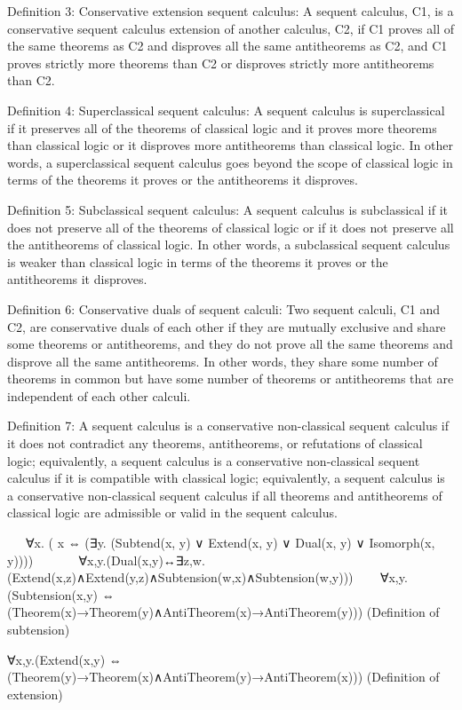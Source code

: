 \documentclass{article}
\begin{document}
Definition 3: Conservative extension sequent calculus:
A sequent calculus, C1, is a conservative sequent calculus extension of another calculus, C2, if C1 proves all of the same theorems as C2 and disproves all the same antitheorems as C2, and C1 proves strictly more theorems than C2 or disproves strictly more antitheorems than C2.

Definition 4: Superclassical sequent calculus:
A sequent calculus is superclassical if it preserves all of the theorems of classical logic and it proves more theorems than classical logic or it disproves more antitheorems than classical logic. In other words, a superclassical sequent calculus goes beyond the scope of classical logic in terms of the theorems it proves or the antitheorems it disproves.

Definition 5: Subclassical sequent calculus:
A sequent calculus is subclassical if it does not preserve all of the theorems of classical logic or if it does not preserve all the antitheorems of classical logic. In other words, a subclassical sequent calculus is weaker than classical logic in terms of the theorems it proves or the antitheorems it disproves.

Definition 6: Conservative duals of sequent calculi:
Two sequent calculi, C1 and C2, are conservative duals of each other if they are mutually exclusive and share some theorems or antitheorems, and they do not prove all the same theorems and disprove all the same antitheorems. In other words, they share some number of theorems in common but have some number of theorems or antitheorems that are independent of each other calculi.

Definition 7: A sequent calculus is a conservative non-classical sequent calculus if it does not contradict any theorems, antitheorems, or refutations of classical logic; equivalently, a sequent calculus is a conservative non-classical sequent calculus if it is compatible with classical logic; equivalently, a sequent calculus is a conservative non-classical sequent calculus if all theorems and antitheorems of classical logic are admissible or valid in the sequent calculus.

   ∀x. ( x ⇔ (∃y. (Subtend(x, y) ∨ Extend(x, y) ∨ Dual(x, y) ∨ Isomorph(x, y))))
   
   ∀x,y.(Dual(x,y)↔∃z,w.(Extend(x,z)∧Extend(y,z)∧Subtension(w,x)∧Subtension(w,y)))
   
∀x,y.(Subtension(x,y) ⇔ (Theorem(x)→Theorem(y)∧AntiTheorem(x)→AntiTheorem(y))) (Definition of subtension)

∀x,y.(Extend(x,y) ⇔ (Theorem(y)→Theorem(x)∧AntiTheorem(y)→AntiTheorem(x))) (Definition of extension)
\end{document}
